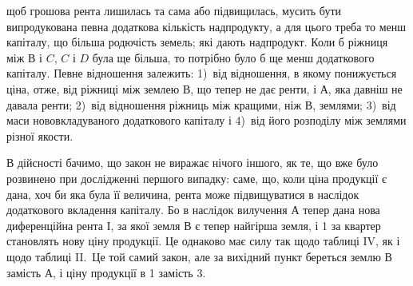 \parcont{}  %
щоб грошова рента лишилась та сама або підвищилась, мусить бути випродукована
певна додаткова кількість надпродукту, а для цього треба то менш
капіталу, що більша родючість земель; які дають надпродукт. Коли б ріжниця
між $В$ і $C$, $C$ і $D$ була ще більша, то потрібно було б ще менш додаткового
капіталу. Певне відношення залежить: 1)~від відношення, в якому понижується
ціна, отже, від ріжниці між землею $В$, що тепер не дає ренти, і $А$, яка давніш
не давала ренти; 2)~від відношення ріжниць між кращими, ніж $В$, землями; 3)~від
маси нововкладуваного додаткового капіталу і 4)~від його розподілу між землями
різної якости.

В дійсності бачимо, що закон не виражає нічого іншого, як те, що вже
було розвинено при дослідженні першого випадку: саме, що, коли ціна продукції
є дана, хоч би яка була її величина, рента може підвищуватися в наслідок
додаткового вкладення капіталу. Бо в наслідок вилучення $А$ тепер дана нова диференційна
рента І, за якої земля $В$ є тепер найгірша земля, і 1 за
квартер становлять нову ціну продукції. Це однаково має силу так щодо таблиці
IV, як і щодо таблиці II.~Це той самий закон, але за вихідний
пункт береться землю $В$ замість $А$, і ціну продукції в 1 замість
3.

